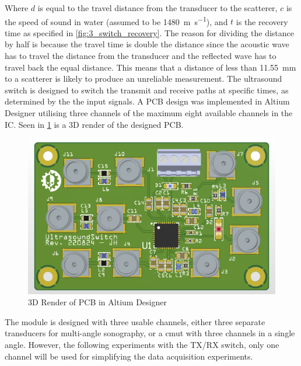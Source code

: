 Where $d$ is equal to the travel distance from the transducer to the scatterer, $c$ is the speed of sound in water (assumed to be \qty{1480}{\meter\per\second}), and $t$ is the recovery time as specified in  \cref{fig:3_switch_recovery}. The reason for dividing the distance by half is because the travel time is double the distance since the acoustic wave has to travel the distance from the transducer and the reflected wave has to travel back the equal distance. This means that a distance of less than \qty{11.55}{\milli\meter} to a scatterer is likely to produce an unreliable measurement. The ultrasound switch is designed to switch the transmit and receive paths at specific times, as determined by the the input signals. A PCB design was implemented in Altium Designer \cite{altium} utilising three channels of the maximum eight available channels in the IC. Seen in \cref{fig:3_ultrasoundswitch} is a 3D render of the designed PCB.

\begin{figure}[htbp]
	\centering
	\includegraphics[width=.8\textwidth]{Figures/3_ultrasoundswitch.png}
	\caption{3D Render of PCB in Altium Designer}
	\label{fig:3_ultrasoundswitch}
\end{figure}
The module is designed with three usable channels, either three separate transducers for multi-angle sonography, or a \gls{cmut} with three channels in a single angle. However, the following experiments with the TX/RX switch, only one channel will be used for simplifying the data acquisition experiments.

